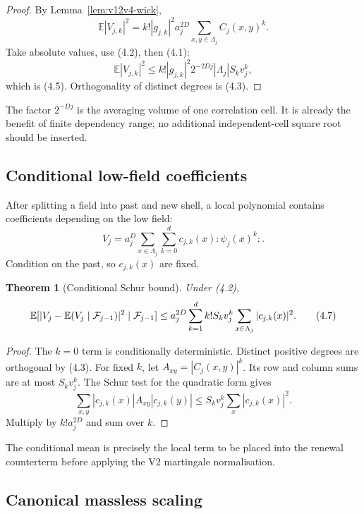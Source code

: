 \documentclass[11pt]{article}
\newtheorem{theorem}{Theorem}[section]
\theoremstyle{remark}
\begin{document}
\begin{proof}
By Lemma~\ref{lem:v12v4-wick},
\[
 \mathbb E|V_{j,k}|^2
 =k!|g_{j,k}|^2a_j^{2D}
       \sum_{x,y\in\Lambda_j}C_j(x,y)^k.
\]
Take absolute values, use (4.2), then (4.1):
\[
 \mathbb E|V_{j,k}|^2
 \le k!|g_{j,k}|^2 2^{-2Dj}
       |\Lambda_j|S_kv_j^k,
\]
which is (4.5).  Orthogonality of distinct degrees is (4.3).
\end{proof}

The factor \(2^{-Dj}\) is the averaging volume of one correlation
cell.  It is already the benefit of finite dependency range; no
additional independent-cell square root should be inserted.

\subsection{Conditional low-field coefficients}

After splitting a field into past and new shell,
a local polynomial contains coefficients depending on the low field:
\[
 V_j=a_j^D\sum_{x\in\Lambda_j}\sum_{k=0}^d
       c_{j,k}(x):\!\psi_j(x)^k\!:.                          \tag{4.6}
\]
Condition on the past, so \(c_{j,k}(x)\) are fixed.

\begin{theorem}[Conditional Schur bound]
\label{thm:v12v4-conditional}
Under (4.2),
\[
 \mathbb E[|V_j-\mathbb E(V_j\mid{\cal F}_{j-1})|^2
                 \mid{\cal F}_{j-1}]
 \le a_j^{2D}\sum_{k=1}^d
       k!S_kv_j^k\sum_{x\in\Lambda_j}|c_{j,k}(x)|^2.         \tag{4.7}
\]
\end{theorem}

\begin{proof}
The \(k=0\) term is conditionally deterministic.  Distinct positive
degrees are orthogonal by (4.3).  For fixed \(k\), let
\(A_{xy}=|C_j(x,y)|^k\).  Its row and column sums are at most
\(S_kv_j^k\).  The Schur test for the quadratic form gives
\[
 \sum_{x,y}|c_{j,k}(x)|A_{xy}|c_{j,k}(y)|
 \le S_kv_j^k\sum_x|c_{j,k}(x)|^2.
\]
Multiply by \(k!a_j^{2D}\) and sum over \(k\).
\end{proof}

The conditional mean is precisely the local term to be placed into
the renewal counterterm before applying the V2 martingale
normalisation.

\subsection{Canonical massless scaling}
\end{document}
